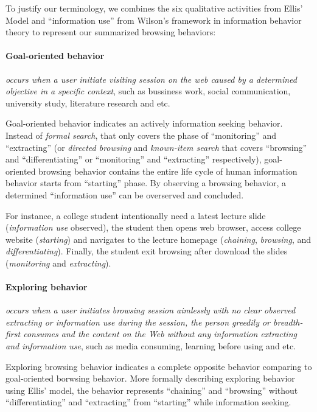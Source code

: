 To justify our terminology, we combines the six qualitative activities from Ellis' Model 
\cite{ellis1989behavioural} and ``information use'' from Wilson's framework 
\cite{wilson1997information} in information behavior theory 
to represent our summarized browsing behaviors:

\paragraph{Goal-oriented behavior} \emph{occurs when a user initiate 
visiting session on the web caused by a determined objective in a specific context}, 
such as bussiness work, 
social communication, university study, literature research and etc. 

Goal-oriented behavior indicates an actively information seeking behavior.
Instead of \emph{formal search}, that only covers the phase of ``monitoring'' and ``extracting''
(or \emph{directed browsing} and \emph{known-item search} that covers ``browsing'' and ``differentiating'' or 
``monitoring'' and ``extracting'' respectively), 
goal-oriented browsing behavior contains the entire life cycle of human information behavior starts
from ``starting'' phase. By observing a browsing behavior, a determined ``information use'' 
can be overserved and concluded.

For instance, a college student intentionally need a latest lecture slide (\emph{information use} observed), 
the student then opens web browser, access college website (\emph{starting}) and navigates to the lecture homepage 
(\emph{chaining}, \emph{browsing}, and \emph{differentiating}).
Finally, the student exit browsing after download the slides (\emph{monitoring} and \emph{extracting}).

\paragraph{Exploring behavior} \emph{occurs when a user initiates browsing session 
aimlessly with no clear observed extracting or information use during the session, 
the person greedily or breadth-first consumes and the content on the Web without 
any information extracting and information use}, such as media consuming, learning 
before using and etc.

Exploring browsing behavior indicates a complete opposite behavior comparing to 
goal-oriented borwsing behavior. More formally describing exploring behavior using Ellis' model, 
the behavior represents ``chaining'' and ``browsing''
without ``differentiating'' and ``extracting'' from ``starting'' while information seeking.

